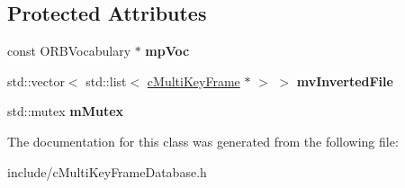 \subsection*{Protected Attributes}
\begin{DoxyCompactItemize}
\item 
const O\+R\+B\+Vocabulary $\ast$ {\bfseries mp\+Voc}\hypertarget{classMultiColSLAM_1_1cMultiKeyFrameDatabase_abdcfff8ce1d6fe5595451b7718817468}{}\label{classMultiColSLAM_1_1cMultiKeyFrameDatabase_abdcfff8ce1d6fe5595451b7718817468}

\item 
std\+::vector$<$ std\+::list$<$ \hyperlink{classMultiColSLAM_1_1cMultiKeyFrame}{c\+Multi\+Key\+Frame} $\ast$ $>$ $>$ {\bfseries mv\+Inverted\+File}\hypertarget{classMultiColSLAM_1_1cMultiKeyFrameDatabase_a70e605cb1144ad5811ef6c952013de88}{}\label{classMultiColSLAM_1_1cMultiKeyFrameDatabase_a70e605cb1144ad5811ef6c952013de88}

\item 
std\+::mutex {\bfseries m\+Mutex}\hypertarget{classMultiColSLAM_1_1cMultiKeyFrameDatabase_a69a4cb117272f1f1ff244b3b0a4c5c61}{}\label{classMultiColSLAM_1_1cMultiKeyFrameDatabase_a69a4cb117272f1f1ff244b3b0a4c5c61}

\end{DoxyCompactItemize}


The documentation for this class was generated from the following file\+:\begin{DoxyCompactItemize}
\item 
include/c\+Multi\+Key\+Frame\+Database.\+h\end{DoxyCompactItemize}
